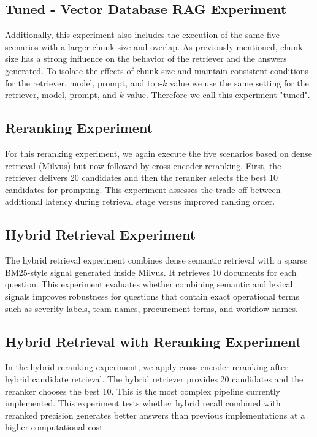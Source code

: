 \subsection{Tuned - Vector Database RAG Experiment}
Additionally, this experiment also includes the execution of the same five scenarios with a larger chunk size and overlap. As previously mentioned, chunk size has a strong influence on the behavior of the retriever and the answers generated. To isolate the effects of chunk size and maintain consistent conditions for the retriever, model, prompt, and top-\( k \) value we use the same setting for the retriever, model, prompt, and \( k \) value. Therefore we call this experiment "tuned".

\subsection{Reranking Experiment}
For this reranking experiment, we again execute the five scenarios based on dense retrieval (Milvus) but now followed by cross encoder reranking. First, the retriever delivers 20 candidates and then the reranker selects the best 10 candidates for prompting. This experiment assesses the trade-off between additional latency during retrieval stage versus improved ranking order.

\subsection{Hybrid Retrieval Experiment}
The hybrid retrieval experiment combines dense semantic retrieval with a sparse BM25-style signal generated inside Milvus. It retrieves 10 documents for each question. This experiment evaluates whether combining semantic and lexical signals improves robustness for questions that contain exact operational terms such as severity labels, team names, procurement terms, and workflow names.

\subsection{Hybrid Retrieval with Reranking Experiment}
In the hybrid reranking experiment, we apply cross encoder reranking after hybrid candidate retrieval. The hybrid retriever provides 20 candidates and the reranker chooses the best 10. This is the most complex pipeline currently implemented. This experiment tests whether hybrid recall combined with reranked precision generates better answers than previous implementations at a higher computational cost.

